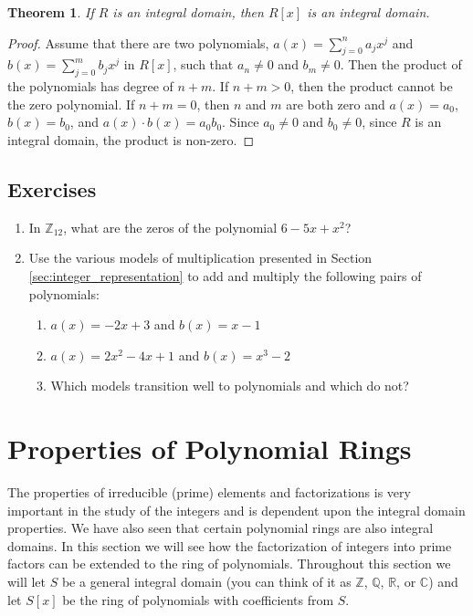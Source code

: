 \documentclass[
]{book}
\providecommand{\tightlist}{%
  \setlength{\itemsep}{0pt}\setlength{\parskip}{0pt}}
\newtheorem{theorem}{Theorem}[chapter]
\theoremstyle{definition}
\theoremstyle{definition}
\theoremstyle{definition}
\theoremstyle{remark}
\begin{document}
\begin{theorem}
\protect\hypertarget{thm:Polynomial-Integral-Domain}{}{\label{thm:Polynomial-Integral-Domain} }If \(R\) is an integral domain, then \(R[x]\) is an integral domain.
\end{theorem}

\begin{proof}
{}Assume that there are two polynomials, \(a(x)=\sum_{j=0}^n a_j x^j\) and \(b(x)=\sum_{j=0}^m b_j x^j\) in \(R[x]\), such that \(a_n\neq 0\) and \(b_m\neq 0\). Then the product of the polynomials has degree of \(n+m\). If \(n+m>0\), then the product cannot be the zero polynomial. If \(n+m=0\), then \(n\) and \(m\) are both zero and \(a(x)=a_0\), \(b(x)=b_0\), and \(a(x)\cdot b(x)=a_0 b_0\). Since \(a_0\neq 0\) and \(b_0\neq 0\), since \(R\) is an integral domain, the product is non-zero.
\end{proof}

\hypertarget{exercises-24}{%
\subsection{Exercises}\label{exercises-24}}

\begin{enumerate}
\def\labelenumi{\arabic{enumi}.}
\item
  In \(\mathbb{Z}_{12}\), what are the zeros of the polynomial \(6-5x+x^2\)?
\item
  Use the various models of multiplication presented in Section \ref{sec:integer_representation} to add and multiply the following pairs of polynomials:

  \begin{enumerate}
  \def\labelenumii{\alph{enumii}.}
  \tightlist
  \item
    \(a(x)=-2x+3\) and \(b(x)=x-1\)
  \item
    \(a(x)=2x^2-4x+1\) and \(b(x)=x^3-2\)
  \item
    Which models transition well to polynomials and which do not?
  \end{enumerate}
\end{enumerate}

\hypertarget{properties-of-polynomial-rings}{%
\section{Properties of Polynomial Rings}\label{properties-of-polynomial-rings}}

The properties of irreducible (prime) elements and factorizations is very important in the study of the integers and is dependent upon the integral domain properties. We have also seen that certain polynomial rings are also integral domains. In this section we will see how the factorization of integers into prime factors can be extended to the ring of polynomials. Throughout this section we will let \(S\) be a general integral domain (you can think of it as \(\mathbb{Z}\), \(\mathbb{Q}\), \(\mathbb{R}\), or \(\mathbb{C}\)) and let \(S[x]\) be the ring of polynomials with coefficients from \(S\).
\end{document}
